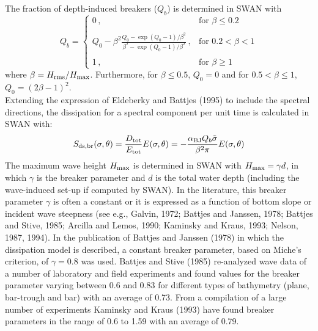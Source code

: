 \documentclass[12pt]{book}
\begin{document}
The fraction of depth-induced breakers ($Q_b$) is determined in SWAN with
\begin{equation}
   Q_b =
    \left\{
      \begin{array}{ll}
         0 \, , & \mbox{for } \beta \leq 0.2 \\
         \\
         Q_0 - \beta^2 \frac{Q_0 - \exp{(Q_0 - 1)/\beta^2}}{\beta^2 - \exp{(Q_0 - 1)/\beta^2}}
         \, , & \mbox{for }  0.2 < \beta < 1\\
         \\
         1 \, , & \mbox{for }  \beta \geq 1
      \end{array}
    \right.
  \label{eq3-25}
\end{equation}
where $\beta = H_{\rm rms}/H_{\rm max}$. Furthermore, for $\beta \leq 0.5$, $Q_0 = 0$ and for
$0.5 < \beta \leq 1$, $Q_0 = (2\beta-1)^2$.
\\[2ex]
\noindent
Extending the expression of Eldeberky and Battjes (1995) to include the spectral directions, the
dissipation for a spectral component per unit time is calculated in SWAN with:
\begin{equation}
  S_{\rm ds,br} (\sigma,\theta) = \frac{D_{\rm tot}}{E_{\rm tot}} E(\sigma,\theta) =
  -\frac{\alpha_{\rm BJ} Q_b \tilde{\sigma}}{\beta^2 \pi} E(\sigma,\theta)
  \label{eq3-26}
\end{equation}
The maximum wave height $H_{\rm max}$ is determined in SWAN with $H_{\rm max} = \gamma d$, in which $\gamma$ is the breaker parameter
and $d$ is the total water depth (including the wave-induced set-up if computed by SWAN). In the literature,
this breaker parameter $\gamma$ is often a constant or it is expressed as a function of bottom slope or incident
wave steepness (see e.g., Galvin, 1972; Battjes and Janssen, 1978; Battjes and Stive, 1985; Arcilla and
Lemos, 1990; Kaminsky and Kraus, 1993; Nelson, 1987, 1994).
In the publication of Battjes and Janssen (1978) in which the dissipation model is described, a constant
breaker parameter, based on Miche's criterion, of $\gamma=0.8$ was used. Battjes and Stive (1985) re-analyzed
wave data of a number of laboratory and field experiments and found values for the breaker parameter
varying between 0.6 and 0.83 for different types of bathymetry (plane, bar-trough and bar) with an average
of 0.73. From a compilation of a large number of experiments Kaminsky and Kraus (1993) have found
breaker parameters in the range of 0.6 to 1.59 with an average of 0.79.
\nocite{Arc90L,Kam93K,Nel87,Nel94}
\\[2ex]
\end{document}
